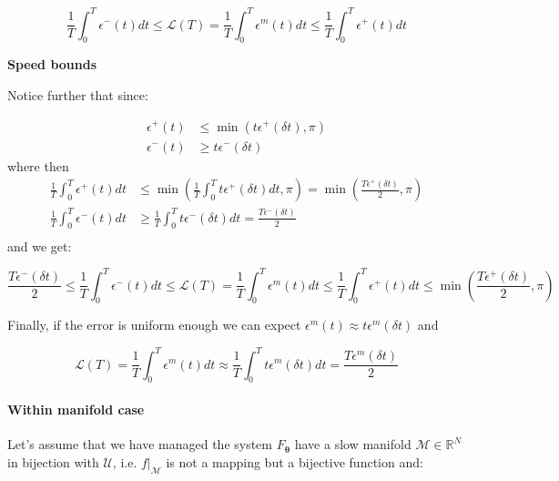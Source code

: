 \documentclass{article} %
\newcounter{ct}
\newcommand{\manifold}{\mathcal{M}}
\theoremstyle{definition}
\theoremstyle{remark}
\begin{document}
\begin{equation}
    \frac{1}{T} \int_0^{T} \epsilon^-(t)dt \leq \mathcal{L}(T) = \frac{1}{T} \int_0^{T} \epsilon^{m}(t) dt \leq  \frac{1}{T} \int_0^{T} \epsilon^+(t) dt
\end{equation}


\textbf{Speed bounds}

Notice further that since:

\begin{equation}
\begin{split}
    \epsilon^+(t) &\leq \min(t\epsilon^+(\delta t), \pi) \\
    \epsilon^-(t) &\geq t\epsilon^-(\delta t)
\end{split}
\end{equation}
where
then
\begin{equation}
\begin{split}
    \frac{1}{T} \int_0^{T} \epsilon^+(t)dt &\leq  \min \left( \frac{1}{T} \int_0^{T} t\epsilon^+(\delta t)dt, \pi \right) = \min \left( \frac{T \epsilon^+(\delta t)}{2}, \pi \right) \\
    \frac{1}{T} \int_0^{T} \epsilon^-(t)dt &\geq  \frac{1}{T} \int_0^{T} t\epsilon^-(\delta t)dt  = \frac{T \epsilon^-(\delta t)}{2} \\
\end{split}
\end{equation}
and we get:

\begin{equation}
    \frac{T \epsilon^-(\delta t)}{2} \leq \frac{1}{T} \int_0^{T} \epsilon^-(t)dt \leq \mathcal{L}(T) = \frac{1}{T} \int_0^{T} \epsilon^{m}(t) dt \leq  \frac{1}{T} \int_0^{T} \epsilon^+(t) dt \leq \min \left( \frac{T \epsilon^+(\delta t)}{2}, \pi \right)
\end{equation}

Finally, if the error is uniform enough we can expect \(\epsilon^{m}(t) \approx t\epsilon^m(\delta t)\) and

\begin{equation}
    \mathcal{L}(T) = \frac{1}{T} \int_0^{T} \epsilon^{m}(t) dt \approx  \frac{1}{T} \int_0^{T} t\epsilon^m(\delta t)dt = \frac{T \epsilon^m(\delta t)}{2}
\end{equation}

\paragraph{Within manifold case}
Let's assume that we have managed the system \(F_{\boldsymbol{\theta}}\)  have a slow manifold \(\manifold \in \mathbb{R}^N\) in bijection with \(\mathcal{U}\), i.e. \(f|_{\manifold}\) is not a mapping but a bijective function and:
\end{document}
